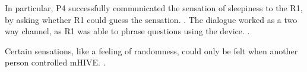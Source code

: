 In particular, P4 successfully communicated the sensation of sleepiness to the R1, by asking whether R1 could guess the sensation.
  .
The dialogue worked as a two way channel, as R1 was able to phrase questions using the device.
	  .%

Certain sensations, like a feeling of randomness, could only be felt when another person controlled mHIVE.
	.


	
	


